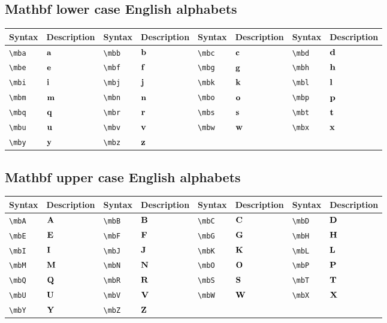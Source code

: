 \documentclass{article}
\begin{document}
	\subsection{Mathbf lower case English alphabets}
	\begin{table}[H]
		\begin{tabular}{|l|l|l|l|l|l|l|l|}
			\hline
			Syntax	&	Description	&	Syntax	&	Description	&	Syntax	&	Description	&	Syntax	&	Description \\
			\hline
			\verb|\mba|	&	$\mathbf{a}$	&	\verb|\mbb|	&	$\mathbf{b}$	&	\verb|\mbc|	&	$\mathbf{c}$	&	\verb|\mbd|	&	$\mathbf{d}$ \\
			\verb|\mbe|	&	$\mathbf{e}$	&	\verb|\mbf|	&	$\mathbf{f}$	&	\verb|\mbg|	&	$\mathbf{g}$	&	\verb|\mbh|	&	$\mathbf{h}$ \\
			\verb|\mbi|	&	$\mathbf{i}$	&	\verb|\mbj|	&	$\mathbf{j}$	&	\verb|\mbk|	&	$\mathbf{k}$	&	\verb|\mbl|	&	$\mathbf{l}$ \\
			\verb|\mbm|	&	$\mathbf{m}$	&	\verb|\mbn|	&	$\mathbf{n}$	&	\verb|\mbo|	&	$\mathbf{o}$	&	\verb|\mbp|	&	$\mathbf{p}$ \\
			\verb|\mbq|	&	$\mathbf{q}$	&	\verb|\mbr|	&	$\mathbf{r}$	&	\verb|\mbs|	&	$\mathbf{s}$	&	\verb|\mbt|	&	$\mathbf{t}$ \\
			\verb|\mbu|	&	$\mathbf{u}$	&	\verb|\mbv|	&	$\mathbf{v}$	&	\verb|\mbw|	&	$\mathbf{w}$	&	\verb|\mbx|	&	$\mathbf{x}$ \\
			\verb|\mby|	&	$\mathbf{y}$	&	\verb|\mbz|	&	$\mathbf{z}$	&		&		&		&	 \\
			\hline	
		\end{tabular}
	\end{table}
	
	\subsection{Mathbf upper case English alphabets}
	\begin{table}[H]
		\begin{tabular}{|l|l|l|l|l|l|l|l|}
			\hline
			Syntax	&	Description	&	Syntax	&	Description	&	Syntax	&	Description	&	Syntax	&	Description \\
			\hline
			\verb|\mbA|	&	$\mathbf{A}$	&	\verb|\mbB|	&	$\mathbf{B}$	&	\verb|\mbC|	&	$\mathbf{C}$	&	\verb|\mbD|	&	$\mathbf{D}$ \\
			\verb|\mbE|	&	$\mathbf{E}$	&	\verb|\mbF|	&	$\mathbf{F}$	&	\verb|\mbG|	&	$\mathbf{G}$	&	\verb|\mbH|	&	$\mathbf{H}$ \\
			\verb|\mbI|	&	$\mathbf{I}$	&	\verb|\mbJ|	&	$\mathbf{J}$	&	\verb|\mbK|	&	$\mathbf{K}$	&	\verb|\mbL|	&	$\mathbf{L}$ \\
			\verb|\mbM|	&	$\mathbf{M}$	&	\verb|\mbN|	&	$\mathbf{N}$	&	\verb|\mbO|	&	$\mathbf{O}$	&	\verb|\mbP|	&	$\mathbf{P}$ \\
			\verb|\mbQ|	&	$\mathbf{Q}$	&	\verb|\mbR|	&	$\mathbf{R}$	&	\verb|\mbS|	&	$\mathbf{S}$	&	\verb|\mbT|	&	$\mathbf{T}$ \\
			\verb|\mbU|	&	$\mathbf{U}$	&	\verb|\mbV|	&	$\mathbf{V}$	&	\verb|\mbW|	&	$\mathbf{W}$	&	\verb|\mbX|	&	$\mathbf{X}$ \\
			\verb|\mbY|	&	$\mathbf{Y}$	&	\verb|\mbZ|	&	$\mathbf{Z}$	&		&		&		&	 \\
			\hline	
		\end{tabular}
	\end{table}
\end{document}
